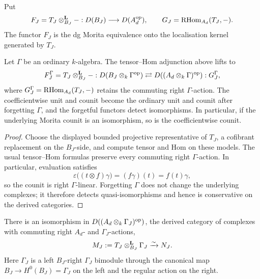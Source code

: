Put
\[
 F_J=T_J\otimes^{\mathbf L}_{B_J}-:D(B_J)\longrightarrow D(A_d^{\mathrm{op}}),
 \qquad
 G_J=\operatorname{RHom}_{A_d}(T_J,-).
\]
The functor \(F_J\) is the dg Morita equivalence onto the localisation kernel generated by \(T_J\).

\begin{lemma}\label{lem:morita-with-coefficients}
Let \(\Gamma\) be an ordinary \(k\)-algebra.  The tensor--Hom adjunction above lifts to
\[
 F_J^\Gamma=T_J\otimes^{\mathbf L}_{B_J}-:
 D(B_J\otimes_k\Gamma^{\mathrm{op}})
 \rightleftarrows
 D((A_d\otimes_k\Gamma)^{\mathrm{op}}):G_J^\Gamma,
\]
where \(G_J^\Gamma=\operatorname{RHom}_{A_d}(T_J,-)\) retains the commuting right \(\Gamma\)-action.  The coefficientwise unit and counit become the ordinary unit and counit after forgetting \(\Gamma\), and the forgetful functors detect isomorphisms.  In particular, if the underlying Morita counit is an isomorphism, so is the coefficientwise counit.
\end{lemma}

\begin{proof}
Choose the displayed bounded projective representative of \(T_J\), a cofibrant replacement on the \(B_J\)-side, and compute tensor and Hom on these models.  The usual tensor--Hom formulas preserve every commuting right \(\Gamma\)-action.  In particular, evaluation satisfies
\[
 \varepsilon\bigl((t\otimes f)\gamma\bigr)
 =(f\gamma)(t)=f(t)\gamma,
\]
so the counit is right \(\Gamma\)-linear.  Forgetting \(\Gamma\) does not change the underlying complexes; it therefore detects quasi-isomorphisms and hence is conservative on the derived categories.
\end{proof}

\begin{proposition}\label{prop:nakayama-cancellation}
There is an isomorphism in \(D((A_d\otimes_k\Gamma_J)^{\mathrm{op}})\), the derived category of complexes with commuting right \(A_d\)- and \(\Gamma_J\)-actions,
\[
 M_J:=T_J\otimes^{\mathbf L}_{B_J}\Gamma_J
 \xrightarrow{\sim}
 N_J.
\]
Here \(\Gamma_J\) is a left \(B_J\)-right \(\Gamma_J\) bimodule through the canonical map \(B_J\to H^0(B_J)=\Gamma_J\) on the left and the regular action on the right.
\end{proposition}

